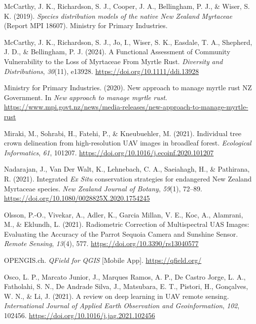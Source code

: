 \documentclass[
]{scrreprt}
\newlength{\cslhangindent}
\newenvironment{CSLReferences}[2] %
 {\begin{list}{}{%
  \setlength{\itemindent}{0pt}
  \setlength{\leftmargin}{0pt}
  \setlength{\parsep}{0pt}
  \setlength{\baselineskip}{12pt}
  \ifodd #1
   \setlength{\leftmargin}{\cslhangindent}
   \setlength{\itemindent}{-1\cslhangindent}
  \fi
  \setlength{\itemsep}{4pt}}}
 {\end{list}}
\begin{document}
\begin{CSLReferences}{1}{0}
McCarthy, J. K., Richardson, S. J., Cooper, J. A., Bellingham, P. J., \&
Wiser, S. K. (2019). \emph{Species distribution models of the native
{New Zealand Myrtaceae}} (Report MPI 18607). Ministry for Primary
Industries.

McCarthy, J. K., Richardson, S. J., Jo, I., Wiser, S. K., Easdale, T.
A., Shepherd, J. D., \& Bellingham, P. J. (2024). A {Functional
Assessment} of {Community Vulnerability} to the {Loss} of {Myrtaceae
From Myrtle Rust}. \emph{Diversity and Distributions}, \emph{30}(11),
e13928. \url{https://doi.org/10.1111/ddi.13928}

Ministry for Primary Industries. (2020). New approach to manage myrtle
rust \textbar{} {NZ Government}. In \emph{New approach to manage myrtle
rust}.
\url{https://www.mpi.govt.nz/news/media-releases/new-approach-to-manage-myrtle-rust}

Miraki, M., Sohrabi, H., Fatehi, P., \& Kneubuehler, M. (2021).
Individual tree crown delineation from high-resolution {UAV} images in
broadleaf forest. \emph{Ecological Informatics}, \emph{61}, 101207.
\url{https://doi.org/10.1016/j.ecoinf.2020.101207}

Nadarajan, J., Van Der Walt, K., Lehnebach, C. A., Saeiahagh, H., \&
Pathirana, R. (2021). Integrated {\emph{Ex Situ}} conservation
strategies for endangered {New Zealand Myrtaceae} species. \emph{New
Zealand Journal of Botany}, \emph{59}(1), 72--89.
\url{https://doi.org/10.1080/0028825X.2020.1754245}

Olsson, P.-O., Vivekar, A., Adler, K., Garcia Millan, V. E., Koc, A.,
Alamrani, M., \& Eklundh, L. (2021). Radiometric {Correction} of
{Multispectral UAS Images}: {Evaluating} the {Accuracy} of the {Parrot
Sequoia Camera} and {Sunshine Sensor}. \emph{Remote Sensing},
\emph{13}(4), 577. \url{https://doi.org/10.3390/rs13040577}

OPENGIS.ch. \emph{QField for QGIS} {[}Mobile App{]}.
\url{https://qfield.org/}

Osco, L. P., Marcato Junior, J., Marques Ramos, A. P., De Castro Jorge,
L. A., Fatholahi, S. N., De Andrade Silva, J., Matsubara, E. T.,
Pistori, H., Gonçalves, W. N., \& Li, J. (2021). A review on deep
learning in {UAV} remote sensing. \emph{International Journal of Applied
Earth Observation and Geoinformation}, \emph{102}, 102456.
\url{https://doi.org/10.1016/j.jag.2021.102456}


\end{CSLReferences}
\end{document}
